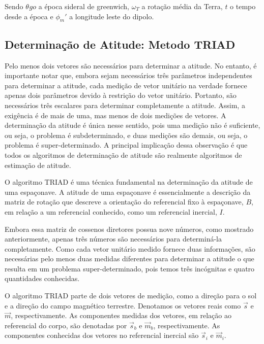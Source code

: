 Sendo $\theta_{}go$ a época sideral de greenwich, $\omega_T$ a rotação média da Terra, $t$ o tempo desde a época e $\phi_m'$ a longitude leste do dipolo.

\subsection{Determinação de Atitude: Metodo TRIAD}\label{sec:3.1.5}

Pelo menos dois vetores são necessários para determinar a atitude. No entanto, é importante notar que, embora sejam necessários três parâmetros independentes para determinar a atitude, cada medição de vetor unitário na verdade fornece apenas dois parâmetros devido à restrição do vetor unitário. Portanto, são necessários três escalares para determinar completamente a atitude. Assim, a exigência é de mais de uma, mas menos de dois medições de vetores. A determinação da atitude é única nesse sentido, pois uma medição não é suficiente, ou seja, o problema é subdeterminado, e duas medições são demais, ou seja, o problema é super-determinado. A principal implicação dessa observação é que todos os algoritmos de determinação de atitude são realmente algoritmos de estimação de atitude.

O algoritmo TRIAD é uma técnica fundamental na determinação da atitude de uma espaçonave. A atitude de uma espaçonave é essencialmente a descrição da matriz de rotação que descreve a orientação do referencial fixo à espaçonave, $B$, em relação a um referencial conhecido, como um referencial inercial, $I$.

Embora essa matriz de cossenos diretores possua nove números, como mostrado anteriormente, apenas três números são necessários para determiná-la completamente. Como cada vetor unitário medido fornece duas informações, são necessárias pelo menos duas medidas diferentes para determinar a atitude o que resulta em um problema super-determinado, pois temos três incógnitas e quatro quantidades conhecidas.

O algoritmo TRIAD parte de dois vetores de medição, como a direção para o sol e a direção do campo magnético terrestre. Denotamos os vetores reais como $\vec{s}$ e $\vec{m}$, respectivamente. As componentes medidas dos vetores, em relação ao referencial do corpo, são denotadas por $\vec{s}_b$ e $\vec{m}_b$, respectivamente. As componentes conhecidas dos vetores no referencial inercial são $\vec{s}_i$ e $\vec{m}_i$.

